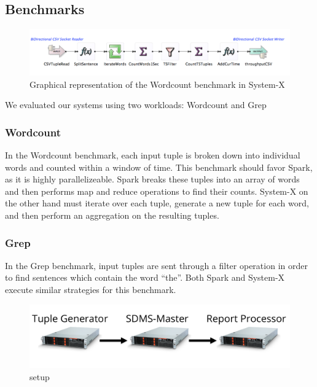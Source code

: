 \subsection{Benchmarks}

\begin{figure}[b]
\centering
\includegraphics[width=1\linewidth]{figures/System-XWorkflow.pdf}
\caption{Graphical representation of the Wordcount benchmark in System-X}
\label{fig:wordcount}
\end{figure}

We evaluated our systems using two workloads: Wordcount and Grep

\subsubsection{Wordcount}
In the Wordcount benchmark, each input tuple is broken down into individual words and counted within a window of time.  This benchmark should favor Spark, as it is highly parallelizeable.   Spark breaks these tuples into an array of words and then performs map and reduce operations to find their counts.  System-X on the other hand must iterate over each tuple, generate a new tuple for each word, and then perform an aggregation on the resulting tuples.

\subsubsection{Grep}
In the Grep benchmark, input tuples are sent through a filter operation in order to find sentences which contain the word ``the''.  Both Spark and System-X execute similar strategies for this benchmark.

\begin{figure}[t]
\centering
\includegraphics[width=1\linewidth]{figures/diagram.pdf}
\caption{setup}
\label{fig:sb1-tput}
\end{figure}

